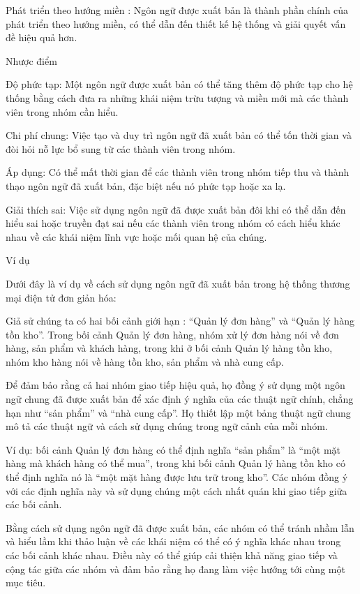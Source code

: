 Phát triển theo hướng miền : Ngôn ngữ được xuất bản là thành phần chính của phát triển theo hướng miền, có thể dẫn đến thiết kế hệ thống và giải quyết vấn đề hiệu quả hơn.

Nhược điểm

Độ phức tạp: Một ngôn ngữ được xuất bản có thể tăng thêm độ phức tạp cho hệ thống bằng cách đưa ra những khái niệm trừu tượng và miền mới mà các thành viên trong nhóm cần hiểu.

Chi phí chung: Việc tạo và duy trì ngôn ngữ đã xuất bản có thể tốn thời gian và đòi hỏi nỗ lực bổ sung từ các thành viên trong nhóm.

Áp dụng: Có thể mất thời gian để các thành viên trong nhóm tiếp thu và thành thạo ngôn ngữ đã xuất bản, đặc biệt nếu nó phức tạp hoặc xa lạ.

Giải thích sai: Việc sử dụng ngôn ngữ đã được xuất bản đôi khi có thể dẫn đến hiểu sai hoặc truyền đạt sai nếu các thành viên trong nhóm có cách hiểu khác nhau về các khái niệm lĩnh vực hoặc mối quan hệ của chúng.

Ví dụ

Dưới đây là ví dụ về cách sử dụng ngôn ngữ đã xuất bản trong hệ thống thương mại điện tử đơn giản hóa:

Giả sử chúng ta có hai bối cảnh giới hạn : “Quản lý đơn hàng” và “Quản lý hàng tồn kho”. Trong bối cảnh Quản lý đơn hàng, nhóm xử lý đơn hàng nói về đơn hàng, sản phẩm và khách hàng, trong khi ở bối cảnh Quản lý hàng tồn kho, nhóm kho hàng nói về hàng tồn kho, sản phẩm và nhà cung cấp.

Để đảm bảo rằng cả hai nhóm giao tiếp hiệu quả, họ đồng ý sử dụng một ngôn ngữ chung đã được xuất bản để xác định ý nghĩa của các thuật ngữ chính, chẳng hạn như “sản phẩm” và “nhà cung cấp”. Họ thiết lập một bảng thuật ngữ chung mô tả các thuật ngữ và cách sử dụng chúng trong ngữ cảnh của mỗi nhóm.

Ví dụ: bối cảnh Quản lý đơn hàng có thể định nghĩa “sản phẩm” là “một mặt hàng mà khách hàng có thể mua”, trong khi bối cảnh Quản lý hàng tồn kho có thể định nghĩa nó là “một mặt hàng được lưu trữ trong kho”. Các nhóm đồng ý với các định nghĩa này và sử dụng chúng một cách nhất quán khi giao tiếp giữa các bối cảnh.

Bằng cách sử dụng ngôn ngữ đã được xuất bản, các nhóm có thể tránh nhầm lẫn và hiểu lầm khi thảo luận về các khái niệm có thể có ý nghĩa khác nhau trong các bối cảnh khác nhau. Điều này có thể giúp cải thiện khả năng giao tiếp và cộng tác giữa các nhóm và đảm bảo rằng họ đang làm việc hướng tới cùng một mục tiêu.

